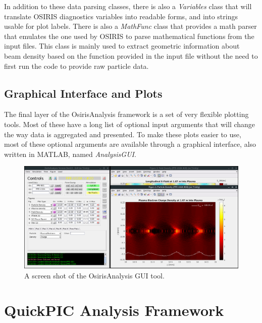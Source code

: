 In addition to these data parsing classes, there is also a \emph{Variables} class that will translate OSIRIS diagnostics variables into readable forms, and into strings usable for plot labels.
There is also a \emph{MathFunc} class that provides a math parser that emulates the one used by OSIRIS to parse mathematical functions from the input files.
This class is mainly used to extract geometric information about beam density based on the function provided in the input file without the need to first run the code to provide raw particle data.

\subsection{Graphical Interface and Plots}
\label{Tools:OALay3}

The final layer of the OsirisAnalysis framework is a set of very flexible plotting tools.
Most of these have a long list of optional input arguments that will change the way data is aggregated and presented.
To make these plots easier to use, most of these optional arguments are available through a graphical interface, also written in MATLAB, named \emph{AnalysisGUI}.

\begin{figure}[hbt]
    \centering
    \includegraphics[width=0.99\linewidth,trim={0mm 0mm 0mm 0mm},clip]{images/OsirisAnalysisGUI}
    \caption{\label{Fig:OAGUI} A screen shot of the OsirisAnalysis GUI tool.}
\end{figure}

\section{QuickPIC Analysis Framework}
\label{Tools:QA}

